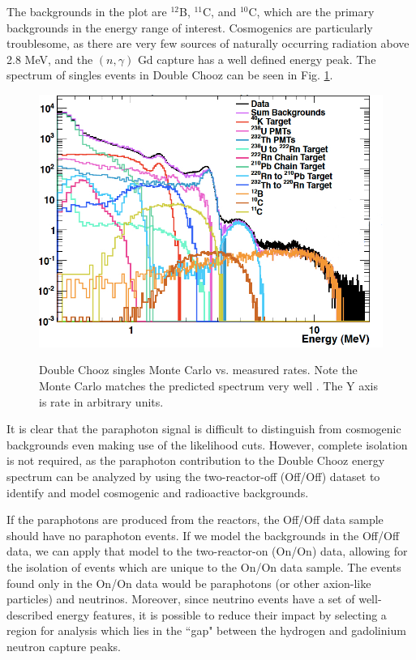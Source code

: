 The backgrounds in the plot are $^{12}$B, $^{11}$C, and $^{10}$C, which are the primary backgrounds in the energy range of interest. Cosmogenics are particularly troublesome, as there are very few sources of naturally occurring radiation above 2.8 MeV, and the $(n,\gamma)$ Gd capture has a well defined energy peak. The spectrum of singles events in Double Chooz can be seen in Fig. \ref{DC_Singles}.

\begin{figure}
\caption{Double Chooz singles Monte Carlo vs. measured rates. Note the Monte Carlo matches the predicted spectrum very well \cite{Lindley}. The Y axis is rate in arbitrary units.}
\includegraphics[width=\textwidth]{Paraphotons/Lindley_Spectrum.jpg}
\label{DC_Singles}
\end{figure}
  
It is clear that the paraphoton signal is difficult to distinguish from cosmogenic backgrounds even making use of the likelihood cuts. However, complete isolation is not required, as the paraphoton contribution to the Double Chooz energy spectrum can be analyzed by using the two-reactor-off (Off/Off) dataset to identify and model cosmogenic and radioactive backgrounds.

If the paraphotons are produced from the reactors, the Off/Off data sample should have no paraphoton events. If we model the backgrounds in the Off/Off data, we can apply that model to the two-reactor-on (On/On) data, allowing for the isolation of events which are unique to the On/On data sample. The events found only in the On/On data would be paraphotons (or other axion-like particles) and neutrinos.  Moreover, since neutrino events have a set of well-described energy features, it is possible to reduce their impact by selecting a region for analysis which lies in the ``gap" between the hydrogen and gadolinium neutron capture peaks. 


